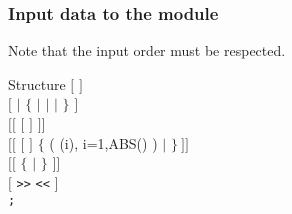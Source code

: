 \clearpage

\vskip 0.2cm
\subsubsection{Input data to the  module}\label{sect:strtinst}

\noindent
Note that the input order must be respected. \\

\begin{DataStructure}{Structure }
$[$   $]$ \\
$[$    $|$   $\{$  $|$  $|$  $|$  $\}$ $]$ \\
$[[$  $[$  $]$    $]]$ \\
$[[$  $[$  $]$    $\{$ 
( (i), i=1,ABS() ) $|$   $\}~]]$ \\
$[[$     
$\{$  $|$  $\}$ $]]$ \\
$[$   {\tt >>}  {\tt <<} $]$ \\
{\tt ;}
\end{DataStructure}

